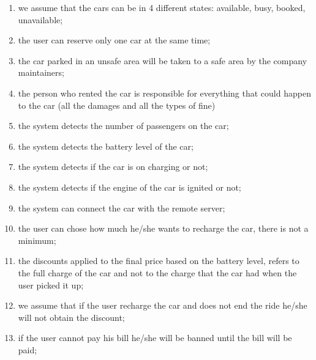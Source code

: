 \begin{enumerate}
	\item we assume that the cars can be in 4 different states: available, busy, booked, unavailable;
	\item the user can reserve only one car at the same time;
	\item the car parked in an unsafe area will be taken to a safe area by the company maintainers;
	\item the person who rented the car is responsible for everything that could happen to the car (all the damages and all the types of fine)
	\item the system detects the number of passengers on the car;
	\item the system detects the battery level of the car;
	\item the system detects if the car is on charging or not;
	\item the system detects if the engine of the car is ignited or not;
	\item the system can connect the car with the remote server;
	\item the user can chose how much he/she wants to recharge the car, there is not a minimum;
	\item the discounts applied to the final price based on the battery level, refers to the full charge of the car and not to the charge that the car had when the user picked it up;
	\item we assume that if the user recharge the car and does not end the ride he/she will not obtain the discount;
	\item if the user cannot pay his bill he/she will be banned until the bill will be paid;
\end{enumerate}

